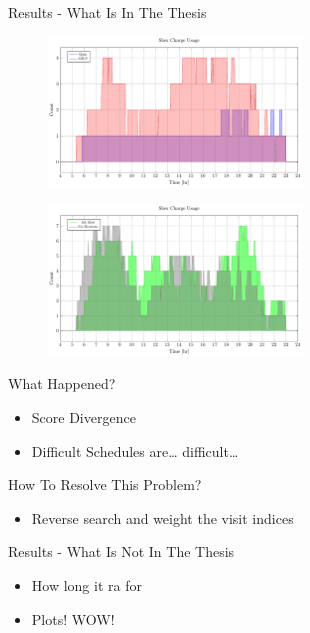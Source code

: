 \documentclass[bigger]{beamer}
\begin{document}
\begin{frame}[label={sec:orge245a87}]{Results - What Is In The Thesis}
\begin{figure}[htpb]
\centering
    \includegraphics[width=0.6\textwidth]{img/sa-pap-paper/charger-count-slow-milp-qin}
\end{figure}
\begin{figure}[htpb]
\centering
    \includegraphics[width=0.6\textwidth]{img/sa-pap-paper/charger-count-slow-sa}
\end{figure}
\end{frame}

\begin{frame}[label={sec:org729c3a5}]{What Happened?}
\begin{itemize}
\item Score Divergence
\item Difficult Schedules are\ldots{} difficult\ldots{}
\end{itemize}
\end{frame}
\begin{frame}[label={sec:org1265c8c}]{How To Resolve This Problem?}
\begin{itemize}
\item Reverse search and weight the visit indices
\end{itemize}
\end{frame}
\begin{frame}[label={sec:org6fc210c}]{Results - What Is Not In The Thesis}
\begin{itemize}
\item How long it ra for
\item Plots! WOW!
\end{itemize}
\end{frame}
\end{document}
